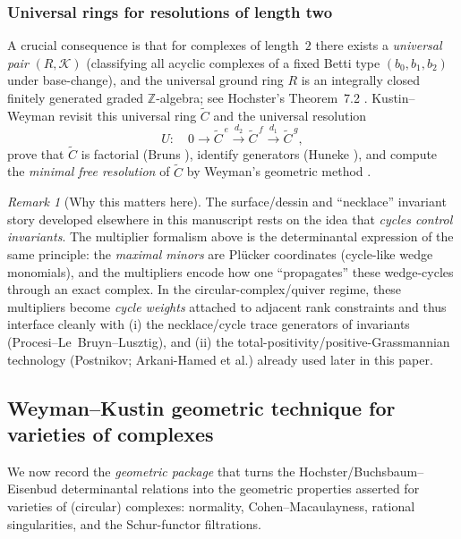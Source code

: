 \documentclass[11pt,oneside]{amsbook}
\numberwithin{equation}{section}
\theoremstyle{plain}
\theoremstyle{definition}
\theoremstyle{remark}
\newtheorem{remark}[theorem]{Remark}
\begin{document}
\subsubsection{Universal rings for resolutions of length two}
A crucial consequence is that for complexes of length~$2$ there exists a \emph{universal pair} $(R,\mathcal{K})$
(classifying all acyclic complexes of a fixed Betti type $(b_0,b_1,b_2)$ under base-change), and the universal
ground ring $R$ is an integrally closed finitely generated graded $\mathbb{Z}$-algebra; see Hochster's
Theorem~7.2 \cite[\S7]{HochsterCBMS24}.
Kustin--Weyman \cite{KustinWeyman2005UniversalRing} revisit this universal ring $\widetilde{C}$ and the
universal resolution
\[
U:\quad 0\to \widetilde{C}^{\,e}\xrightarrow{d_2}\widetilde{C}^{\,f}\xrightarrow{d_1}\widetilde{C}^{\,g},
\]
prove that $\widetilde{C}$ is factorial (Bruns \cite{Bruns1983DivisorsComplexes,Bruns1984GenericFreeResolutions}),
identify generators (Huneke \cite{Huneke1981ArithmeticPerfection}), and compute the \emph{minimal free resolution}
of $\widetilde{C}$ by Weyman's geometric method \cite{KustinWeyman2005UniversalRing,Weyman2003CohomologySyzygies}.

\begin{remark}[Why this matters here]\label{rem:hochster-matters}
The surface/dessin and ``necklace'' invariant story developed elsewhere in this manuscript rests on the idea that
\emph{cycles control invariants}.  The multiplier formalism above is the determinantal expression of the same
principle: the \emph{maximal minors} are Pl\"ucker coordinates (cycle-like wedge monomials), and the multipliers
encode how one ``propagates'' these wedge-cycles through an exact complex.
In the circular-complex/quiver regime, these multipliers become \emph{cycle weights} attached to adjacent rank
constraints and thus interface cleanly with (i) the necklace/cycle trace generators of invariants
(Procesi--Le~Bruyn--Lusztig), and (ii) the total-positivity/positive-Grassmannian technology
(Postnikov; Arkani-Hamed et al.) already used later in this paper.
\end{remark}

\subsection{Weyman--Kustin geometric technique for varieties of complexes}\label{subsec:weyman-geometric-technique}

We now record the \emph{geometric package} that turns the Hochster/Buchsbaum--Eisenbud determinantal relations
into the geometric properties asserted for varieties of (circular) complexes: normality, Cohen--Macaulayness,
rational singularities, and the Schur-functor filtrations.
\end{document}
